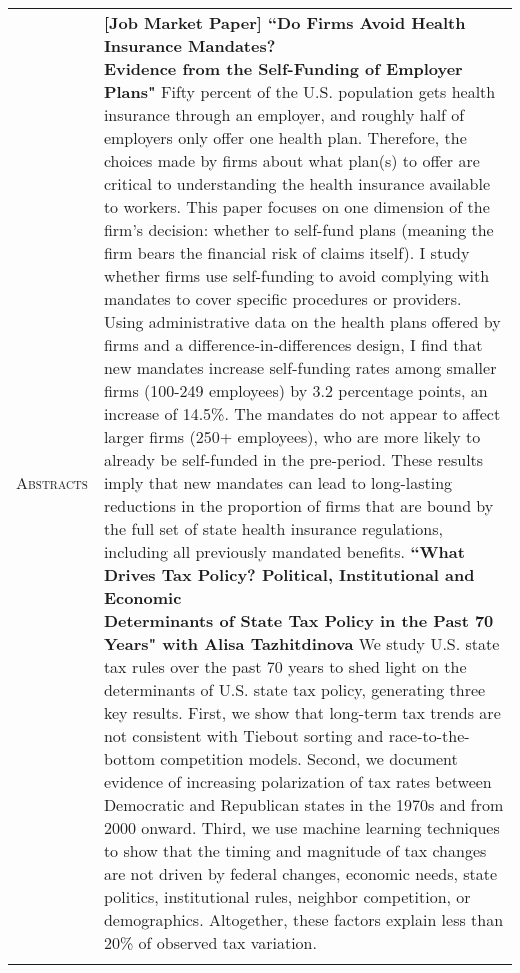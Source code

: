 \documentclass[11pt]{article}
\begin{document}
\begin{tabularx}{\textwidth}{@{}Y Z@{}}
	\textsc{Abstracts}  & 
	\textbf{[Job Market Paper] ``Do Firms Avoid Health Insurance Mandates? \newline Evidence from the Self-Funding of Employer Plans"} 
	\vspace{5pt} \newline
	Fifty percent of the U.S. population gets health insurance through an employer, and roughly half of employers only offer one health plan. Therefore, the choices made by firms about what plan(s) to offer are critical to understanding the health insurance available to workers. This paper focuses on one dimension of the firm's decision: whether to self-fund plans (meaning the firm bears the financial risk of claims itself). I study whether firms use self-funding to avoid complying with mandates to cover specific procedures or providers. Using administrative data on the health plans offered by firms and a difference-in-differences design, I find that new mandates increase self-funding rates among smaller firms (100-249 employees) by 3.2 percentage points, an increase of 14.5\%. The mandates do not appear to affect larger firms (250+ employees), who are more likely to already be self-funded in the pre-period. These results imply that new mandates can lead to long-lasting reductions in the proportion of firms that are bound by the full set of state health insurance regulations, including all previously mandated benefits. 
	\vspace{20pt} \newline
	\textbf{``What Drives Tax Policy? Political, Institutional and Economic \newline Determinants of State Tax Policy in the Past 70 Years" with Alisa Tazhitdinova} 
	\vspace{-8pt} \newline 
	We study U.S. state tax rules over the past 70 years to shed light on the determinants of U.S. state tax policy, generating three key results. First, we show that long-term tax trends are not consistent with Tiebout sorting and race-to-the-bottom competition models. Second, we document evidence of increasing polarization of tax rates between Democratic and Republican states in the 1970s and from 2000 onward. Third, we use machine learning techniques to show that the timing and magnitude of tax changes are not driven by federal changes, economic needs, state politics, institutional rules, neighbor competition, or demographics. Altogether, these factors explain less than 20\% of observed tax variation.
	\\
	\newpage
	

\end{tabularx}
\end{document}

